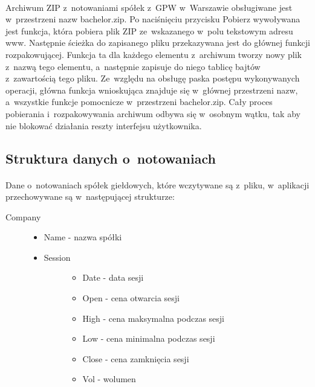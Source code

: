 \paragraph{}
Archiwum ZIP z~notowaniami spółek z~GPW w~Warszawie obsługiwane jest w~przestrzeni nazw bachelor.zip. Po naciśnięciu przycisku Pobierz wywoływana jest funkcja, która pobiera plik ZIP ze~wskazanego w~polu tekstowym adresu www. Następnie ścieżka do zapisanego pliku przekazywana jest do głównej funkcji rozpakowującej. Funkcja ta dla każdego elementu z~archiwum tworzy nowy plik z~nazwą tego elementu, a~następnie zapisuje do niego tablicę bajtów z~zawartością tego pliku. Ze~względu na obsługę paska postępu wykonywanych operacji, główna funkcja wnioskująca znajduje się w~głównej przestrzeni nazw, a~wszystkie funkcje pomocnicze w~przestrzeni bachelor.zip. Cały proces pobierania i~rozpakowywania archiwum odbywa się w~osobnym wątku, tak aby nie blokować działania reszty interfejsu użytkownika.

\subsection{Struktura danych o~notowaniach}

\paragraph{}
Dane o~notowaniach spółek giełdowych, które wczytywane są z~pliku, w~aplikacji przechowywane są w~następującej strukturze:
\begin{description} 
	\item[Company] \hfill
		\begin{itemize}
			\item Name - nazwa spółki
			\item \begin{description}
					\item[Session] \hfill
						\begin{itemize}
							\item Date - data sesji
							\item Open - cena otwarcia sesji
							\item High - cena maksymalna podczas sesji
							\item Low - cena minimalna podczas sesji
							\item Close - cena zamknięcia sesji
							\item Vol - wolumen
						\end{itemize}
				\end{description}
		\end{itemize}
\end{description}

